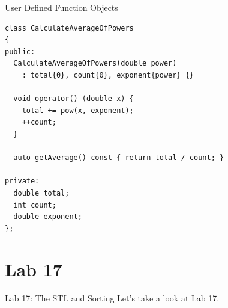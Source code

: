 \documentclass[14pt,aspectratio=1610]{beamer}
\begin{document}
\begin{frame}[fragile]{User Defined Function Objects}
\begin{lstlisting}[basicstyle=\footnotesize\ttfamily]
class CalculateAverageOfPowers
{
public:
  CalculateAverageOfPowers(double power) 
    : total{0}, count{0}, exponent{power} {}

  void operator() (double x) {
    total += pow(x, exponent);
    ++count;
  }

  auto getAverage() const { return total / count; }

private:
  double total;
  int count;
  double exponent;
};
\end{lstlisting}
\end{frame}

\section*{Lab 17}
\begin{frame}{Lab 17: The STL and Sorting}
\centering\Large
  Let's take a look at Lab 17.
\end{frame}
\end{document}
